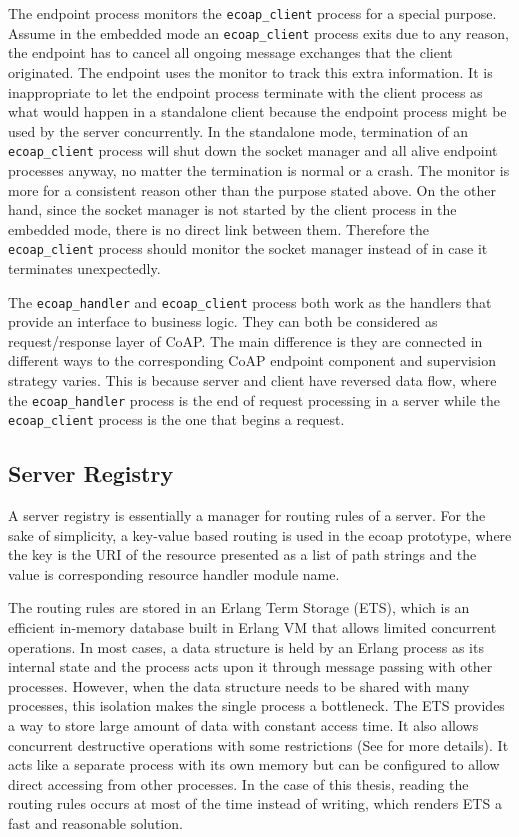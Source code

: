The endpoint process monitors the \verb|ecoap_client| process for a special purpose. Assume in the embedded mode an \verb|ecoap_client| process exits due to any reason, the endpoint has to cancel all ongoing message exchanges that the client originated. The endpoint uses the monitor to track this extra information. It is inappropriate to let the endpoint process terminate with the client process as what would happen in a standalone client because the endpoint process might be used by the server concurrently. In the standalone mode, termination of an \verb|ecoap_client| process will shut down the socket manager and all alive endpoint processes anyway, no matter the termination is normal or a crash. The monitor is more for a consistent reason other than the purpose stated above. On the other hand, since the socket manager is not started by the client process in the embedded mode, there is no direct link between them. Therefore the \verb|ecoap_client| process should monitor the socket manager instead of in case it terminates unexpectedly.

The \verb|ecoap_handler| and \verb|ecoap_client| process both work as the handlers that provide an interface to business logic. They can both be considered as request/response layer of CoAP. The main difference is they are connected in different ways to the corresponding CoAP endpoint component and supervision strategy varies. This is because server and client have reversed data flow, where the \verb|ecoap_handler| process is the end of request processing in a server while the \verb|ecoap_client| process is the one that begins a request.

\subsection{Server Registry}\label{coap_registry}

A server registry is essentially a manager for routing rules of a server. For the sake of simplicity, a key-value based routing is used in the ecoap prototype, where the key is the URI of the resource presented as a list of path strings and the value is corresponding resource handler module name. 

The routing rules are stored in an Erlang Term Storage (ETS), which is an efficient in-memory database built in Erlang VM that allows limited concurrent operations. In most cases, a data structure is held by an Erlang process as its internal state and the process acts upon it through message passing with other processes. However, when the data structure needs to be shared with many processes, this isolation makes the single process a bottleneck. The ETS provides a way to store large amount of data with constant access time. It also allows concurrent destructive operations with some restrictions (See \autocite{ets} for more details). It acts like a separate process with its own memory but can be configured to allow direct accessing from other processes. In the case of this thesis, reading the routing rules occurs at most of the time instead of writing, which renders ETS a fast and reasonable solution. 

